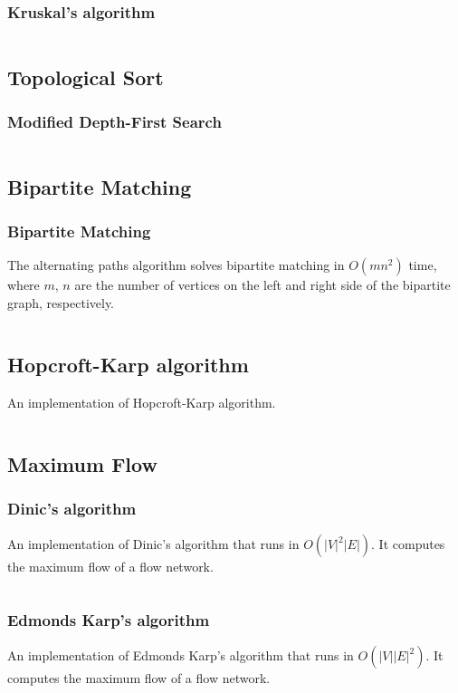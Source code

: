 \documentclass[9pt,a4paper]{amsart}
\newcommand{\code}[1]{\inputminted[linenos]{cpp}{_code/#1}}
\begin{document}
        \subsubsection{Kruskal's algorithm}
            \code{graph/kruskals_mst.cpp}

    \subsection{Topological Sort}
        \subsubsection{Modified Depth-First Search}
            \code{graph/tsort.cpp}

    \subsection{Bipartite Matching}

        \subsubsection{Bipartite Matching}
            The alternating paths algorithm solves bipartite matching in $O(mn^2)$
            time, where $m$, $n$ are the number of vertices on the left and right
            side of the bipartite graph, respectively.
            \code{graph/bipartite_matching.cpp}

        \subsection{Hopcroft-Karp algorithm}
            An implementation of Hopcroft-Karp algorithm.
            \code{graph/hopcroft_karp.cpp}

    \subsection{Maximum Flow}
        \subsubsection{Dinic's algorithm}
            An implementation of Dinic's algorithm that runs in
            $O(|V|^2|E|)$. It computes the maximum flow of a flow network.
            \code{graph/dinic.cpp}

        \subsubsection{Edmonds Karp's algorithm}
            An implementation of Edmonds Karp's algorithm that runs in
            $O(|V||E|^2)$. It computes the maximum flow of a flow network.
            \code{graph/edmonds_karps.cpp}
\end{document}
